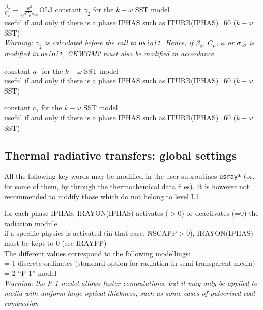{$\frac{\beta_2}{C_\mu}-\frac{\kappa^2}{\sqrt{C_\mu}\sigma_{\omega 2}}$}{O}{L3}
{constant $\gamma_2$ for the $k-\omega$ SST model\\
useful if and only if there is a phase IPHAS such as ITURB(IPHAS)=60
($k-\omega$ SST)\\
{\em Warning: $\gamma_2$ is calculated before the call to
\texttt{usini1}. Hence, if $\beta_2$, $C_\mu$, $\kappa$ or $\sigma_{\omega 2}$ 
is modified in \texttt{usini1}, CKWGM2 must also be modified in accordance}}

{constant $a_1$ for the $k-\omega$ SST model\\
useful if and only if there is a phase IPHAS such as ITURB(IPHAS)=60
($k-\omega$ SST)}

{constant $c_1$ for the $k-\omega$ SST model\\
useful if and only if there is a phase IPHAS such as ITURB(IPHAS)=60
($k-\omega$ SST)}


\subsection{Thermal radiative transfers: global settings}

All the following key words may be modified in the user subroutines
\texttt{usray*} (or, for some of them, by through the thermochemical data files).
It is however not recommended to modify those which do not belong to 
level L1.

{for each phase IPHAS, IRAYON(IPHAS) activates ($>0$) or deactivates
(=0) the radiation module\\ 
if a specific physics is activated (in that case, NSCAPP$>$0), 
IRAYON(IPHAS) must be kept to 0 (see IRAYPP)\\
The different values correspond to the following modellings:\\
\hspace*{1.3cm} = 1 discrete ordinates 
(standard option for radiation in semi-transparent media)\\
\hspace*{1.3cm} = 2  ``P-1'' model\\
{\em Warning: the P-1 model allows faster computations, but it 
may only be applied to media with uniform large optical thickness, such as
some cases of pulverised coal combustion}}


